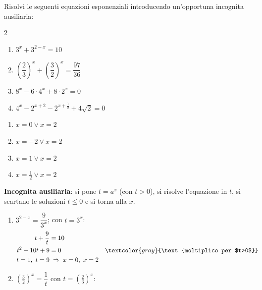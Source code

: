 
\begin{question}[ID=3.6, subtitle={Equazioni esponenziali con incognita ausiliaria}, difficulty=difficile, tags={equazioni, esponenziali, sostituzione}]
Risolvi le seguenti equazioni esponenziali introducendo un'opportuna incognita ausiliaria:
\begin{center}\begin{minipage}{0.92\linewidth}
\begin{multicols}{2}
\begin{enumerate}[leftmargin=3.2cm]
\item $3^{x} + 3^{2-x} = 10$
\item $\left(\dfrac{2}{3}\right)^{x} + \left(\dfrac{3}{2}\right)^{x} = \dfrac{97}{36}$
\item $8^{x} - 6 \cdot 4^{x} + 8 \cdot 2^{x} = 0$
\item $4^{x} - 2^{x+2} - 2^{x+\frac{1}{2}} + 4\sqrt{2} = 0$
\end{enumerate}
\end{multicols}
\end{minipage}\end{center}
\begin{solution}
\begin{enumerate}
    \item $x=0\vee x=2$
    \item $x=-2\vee x=2$
    \item $x=1\vee x=2$
    \item $x=\tfrac12\vee x=2$
\end{enumerate}
\end{solution}
\begin{explanation}
\textbf{Incognita ausiliaria}: si pone $t=a^x$ (con $t>0$), si risolve l'equazione in $t$, si scartano le soluzioni $t\leq0$ e si torna alla $x$.
\begin{enumerate}
    \item $3^{2-x}=\dfrac{9}{3^x}$; con $t=3^x$:
    \[\begin{aligned}
    t+\dfrac9t &= 10\\
    t^2-10t+9 &= 0 && \textcolor{gray}{\text{moltiplico per $t>0$}}\\
    t=1,\ t=9 &\;\Rightarrow\; x=0,\ x=2
    \end{aligned}\]
    \item $\left(\tfrac32\right)^x=\dfrac1t$ con $t=\left(\tfrac23\right)^x$:
    \[\begin{aligned}

\end{aligned}\]
\end{enumerate}
\end{explanation}
\end{question}
